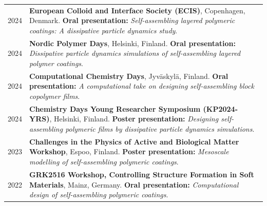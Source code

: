 \documentclass[a4paper,10pt]{article}
\begin{document}
\small
\begin{tabularx}{\linewidth}{@{}K Y@{}}
2024 & \textbf{European Colloid and Interface Society (ECIS)}, Copenhagen, Denmark. \textbf{Oral presentation:} \textit{Self-assembling layered polymeric coatings: A dissipative particle dynamics study}. \\
2024 & \textbf{Nordic Polymer Days}, Helsinki, Finland. \textbf{Oral presentation:} \textit{Dissipative particle dynamics simulations of self-assembling layered polymer coatings}. \\
2024 & \textbf{Computational Chemistry Days}, Jyväskylä, Finland. \textbf{Oral presentation:} \textit{A computational take on designing self-assembling block copolymer films}. \\
2024 & \textbf{Chemistry Days Young Researcher Symposium (KP2024-YRS)}, Helsinki, Finland. \textbf{Poster presentation:} \textit{Designing self-assembling polymeric films by dissipative particle dynamics simulations}. \\
2023 & \textbf{Challenges in the Physics of Active and Biological Matter Workshop}, Espoo, Finland. \textbf{Poster presentation:} \textit{Mesoscale modelling of self-assembling polymeric coatings}. \\
2022 & \textbf{GRK2516 Workshop, Controlling Structure Formation in Soft Materials}, Mainz, Germany. \textbf{Oral presentation:} \textit{Computational design of self-assembling polymeric coatings}. \\
\end{tabularx}
\normalsize
\end{document}
